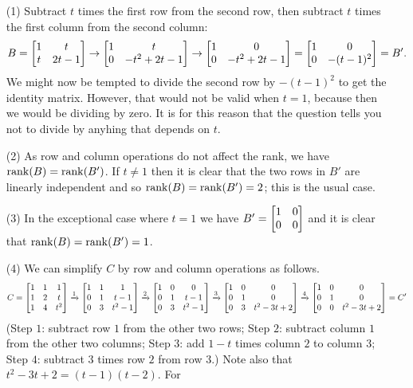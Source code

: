 \documentclass[a4paper]{amsart}
\renewenvironment{solution}{\SolutionInline}{\endSolutionInline}
\begin{document}
\begin{solution}
 \begin{itemize}
  \item[(1)] Subtract $t$ times the first row from the second row,
   then subtract $t$ times the first column from the second column:
   \[ B =
      \left[\begin{matrix} 1&t \\ t&2t-1 \end{matrix}\right] \to 
      \left[\begin{matrix} 1&t \\ 0 & -t^2+2t-1 \end{matrix}\right] \to
      \left[\begin{matrix} 1&0 \\ 0 & -t^2+2t-1 \end{matrix}\right] = 
      \left[\begin{matrix} 1&0 \\ 0 & -(t-1)^2 \end{matrix}\right] = B'.
   \]
   We might now be tempted to divide the second row by $-(t-1)^2$ to
   get the identity matrix.  However, that would not be valid when
   $t=1$, because then we would be dividing by zero.  It is for this
   reason that the question tells you not to divide by anyhing that
   depends on $t$.
  \item[(2)] As row and column operations do not affect the rank, we
   have $\operatorname{rank}(B)=\operatorname{rank}(B')$.  If $t\neq 1$ then it is clear that the
   two rows in $B'$ are linearly independent and so
   $\operatorname{rank}(B)=\operatorname{rank}(B')=2$; this is the usual case.
  \item[(3)] In the exceptional case where $t=1$ we have
   $B'=\left[\begin{matrix} 1&0\\0&0\end{matrix}\right]$ and it is clear that $\operatorname{rank}(B)=\operatorname{rank}(B')=1$.
  \item[(4)] We can simplify $C$ by row and column operations as
   follows. 
   \[ C = 
      \left[\begin{matrix} 1 & 1 & 1 \\
           1 & 2 & t \\
           1 & 4 & t^2 \end{matrix}\right] \xrightarrow{1}
      \left[\begin{matrix} 1 & 1 & 1 \\
           0 & 1 & t-1 \\
           0 & 3 & t^2-1 \end{matrix}\right] \xrightarrow{2}
      \left[\begin{matrix} 1 & 0 & 0 \\
           0 & 1 & t-1 \\
           0 & 3 & t^2-1 \end{matrix}\right] \xrightarrow{3}
      \left[\begin{matrix} 1 & 0 & 0 \\
           0 & 1 & 0 \\
           0 & 3 & t^2-3t+2 \end{matrix}\right] \xrightarrow{4}
      \left[\begin{matrix} 1 & 0 & 0 \\
           0 & 1 & 0 \\
           0 & 0 & t^2-3t+2 \end{matrix}\right] = C'
   \]
   (Step $1$: subtract row $1$ from the other two rows; Step $2$:
   subtract column $1$ from the other two columns; Step $3$: add
   $1-t$ times column $2$ to column $3$; Step $4$: subtract $3$ times
   row $2$ from row $3$.)  Note also that $t^2-3t+2=(t-1)(t-2)$.  For

\end{itemize}
\end{solution}
\end{document}
